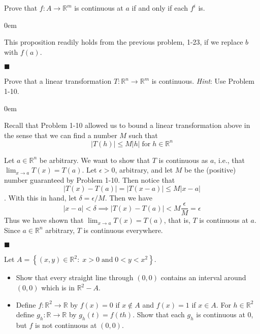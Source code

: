 \documentclass[12pt]{article}
\renewcommand{\qed}{\hfill$\blacksquare$}
\renewenvironment{proof}{\begin{addmargin}[1em]{0em}\begin{newproof}}{\end{newproof}\end{addmargin}\qed}
\newenvironment{problem}[2][Problem]{\begin{trivlist}
\item[\hskip \labelsep {\bfseries #1}\hskip \labelsep {\bfseries #2.}]}{\end{trivlist}}
\begin{document}
 
 
\begin{problem}{1.24}
Prove that $f:A\rightarrow \mathbb{R}^m$ is continuous at $a$ if and only if each $f^i$ is.
\end{problem} 
 
 \begin{proof}
 This proposition readily holds from the previous problem, 1-23, if we replace $b$ with $f\left(a\right)$.
 \end{proof}
 
 
 
 
 
\begin{problem}{1.25}
 Prove that a linear transformation $T:\mathbb{R}^n\rightarrow \mathbb{R}^m$ is continuous. \textit{Hint}: Use Problem 1-10.
\end{problem}

 \begin{proof}
 Recall that Problem 1-10 allowed us to bound a linear transformation above in the sense that we can find a number $M$ such that 
 $$ \left|T\left(h\right)\right| \leq M \left| h\right| \; \text{for} \; h \in \mathbb{R}^n$$
 
Let $a\in \mathbb{R}^n$ be arbitrary. We want to show that $T$ is continuous as $a$, i.e., that $\lim_{x\rightarrow a} T\left(x\right) = T\left(a\right)$. Let $\epsilon > 0$, arbitrary, and let $M$ be the (positive) number guaranteed by Problem 1-10. Then notice that
$$ \left| T\left(x\right) - T\left(a\right) \right| = \left| T\left(x-a\right)\right| \leq M \left|x-a\right| $$. With this in hand, let $\delta = \epsilon / M$. Then we have 
$$ \left|x-a\right| < \delta \implies \left|T\left(x\right) - T\left(a\right)\right| < M \frac{\epsilon}{M} = \epsilon $$
Thus we have shown that $\lim_{x\rightarrow a} T\left(x\right) = T\left(a\right)$, that is, $T$ is continuous at $a$. Since $a\in \mathbb{R}^n$ arbitrary, $T$ is continuous everywhere.
 \end{proof}
 
 
 
 \begin{problem}{1.26}
 Let $A = \left\{ \left(x,y\right) \in \mathbb{R}^2: \; x>0 \; \text{and} \; 0<y<x^2 \right\}$.
 \begin{itemize}
 	\item Show that every straight line through $\left(0,0\right)$ contains an interval around $\left(0,0\right)$ which is in $\mathbb{R}^2-A$. \\
 	\item Define $f: \mathbb{R}^2\rightarrow \mathbb{R}$ by $f\left(x\right)=0$ if $x \notin A$ and $f\left(x\right)=1$ if $x\in A$. For $h\in \mathbb{R}^2$ define $g_h: \mathbb{R}\rightarrow \mathbb{R}$ by $g_h\left(t\right) = f\left(th\right)$. Show that each $g_h$ is continuous at $0$, but $f$ is not continuous at $\left(0,0\right)$.
 \end{itemize}
 \end{problem}
 
\end{document}
